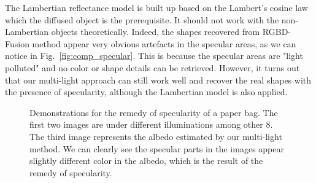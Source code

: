 The Lambertian reflectance model is built up based on the Lambert's cosine law which the diffused object is the prerequisite.
It should not work with the non-Lambertian objects theoretically.
Indeed, the shapes recovered from RGBD-Fusion method appear very obvious artefacts in the specular areas, as we can notice in Fig.~\ref{fig:comp_specular}.
This is because the specular areas are "light polluted" and no color or shape details can be retrieved.
However, it turns out that our multi-light approach can still work well and recover the real shapes with the presence of specularity, although the Lambertian model is also applied.
\begin{figure}[H]
\centering
{}
\caption{Demonstrations for the remedy of specularity of a paper bag. The first two images are under different illuminations among other 8. The third image represents the albedo estimated by our multi-light method. We can clearly see the specular parts in the images appear slightly different color in the albedo, which is the result of the remedy of specularity.}
\label{fig:specular_illu}
\end{figure}

